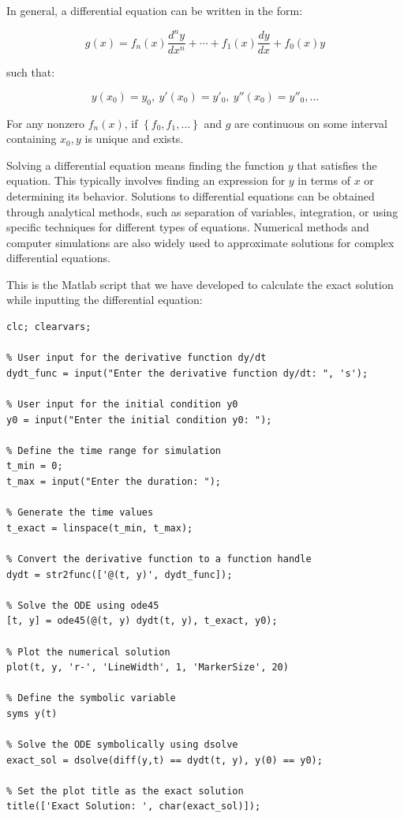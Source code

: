 \documentclass[13pt,a4paper]{report}
\begin{document}
In general, a differential equation can be written in the form:

$$g(x)=f_n(x)\dfrac{d^ny}{dx^n}+\cdots+f_1(x)\dfrac{dy}{dx}+f_0(x)y$$

such that:

$$y(x_0)=y_0,\ y'(x_0)=y'_0,\ y''(x_0)=y''_0,\dots$$

For any nonzero $f_n(x)$, if $\left\{f_0, f_1, \dots\right\}$ and $g$ are continuous on some interval containing $x_0, y$ is unique and exists.

Solving a differential equation means finding the function $y$ that satisfies the equation. This typically involves finding an expression for $y$ in terms of $x$ or determining its behavior. Solutions to differential equations can be obtained through analytical methods, such as separation of variables, integration, or using specific techniques for different types of equations. Numerical methods and computer simulations are also widely used to approximate solutions for complex differential equations.

This is the Matlab script that we have developed to calculate the exact solution while inputting the differential equation:\\[-0.3cm]

\begin{verbatim}
clc; clearvars;

% User input for the derivative function dy/dt
dydt_func = input("Enter the derivative function dy/dt: ", 's');

% User input for the initial condition y0
y0 = input("Enter the initial condition y0: ");

% Define the time range for simulation
t_min = 0;
t_max = input("Enter the duration: ");

% Generate the time values
t_exact = linspace(t_min, t_max);

% Convert the derivative function to a function handle
dydt = str2func(['@(t, y)', dydt_func]);

% Solve the ODE using ode45
[t, y] = ode45(@(t, y) dydt(t, y), t_exact, y0);

% Plot the numerical solution
plot(t, y, 'r-', 'LineWidth', 1, 'MarkerSize', 20)

% Define the symbolic variable
syms y(t)

% Solve the ODE symbolically using dsolve
exact_sol = dsolve(diff(y,t) == dydt(t, y), y(0) == y0);

% Set the plot title as the exact solution
title(['Exact Solution: ', char(exact_sol)]);

\end{verbatim}
\end{document}
